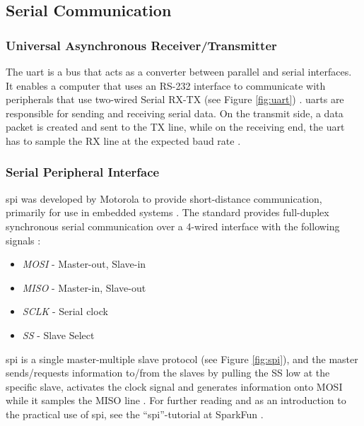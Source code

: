 \subsection{Serial Communication}
\subsubsection{Universal Asynchronous Receiver/Transmitter}
\label{sec:uart}
The \acrfull{uart} is a bus that acts as a converter between parallel and serial interfaces. It enables a computer that uses an RS-232 interface to communicate with peripherals that use two-wired Serial RX-TX (see Figure \ref{fig:uart}) \cite{whatisuart}.
\acrshort{uart}s are responsible for sending and receiving serial data. On the transmit side, a data packet is created and sent to the TX line, while on the receiving end, the \acrshort{uart} has to sample the RX line at the expected baud rate \cite{sparkfunuart}.

\subsubsection{Serial Peripheral Interface}
\label{sec:spi}
\acrfull{spi} was developed by Motorola to provide short-distance communication, primarily for use in embedded systems \cite{corelis2016}. The standard provides full-duplex synchronous serial communication over a 4-wired interface with the following signals \cite{epanorama2011}:
\begin{itemize}
    \item \textit{MOSI} - Master-out, Slave-in
    \item \textit{MISO} - Master-in, Slave-out
    \item \textit{SCLK} - Serial clock
    \item \textit{SS} - Slave Select
\end{itemize}
\acrshort{spi} is a single master-multiple slave protocol (see Figure \ref{fig:spi}), and the master sends/requests information to/from the slaves by pulling the SS low at the specific slave, activates the clock signal and generates information onto MOSI while it samples the MISO line \cite{byteparadigm}. For further reading and as an introduction to the practical use of \acrshort{spi}, see the ``\acrfull{spi}''-tutorial at SparkFun \cite{sparkfunspi}.